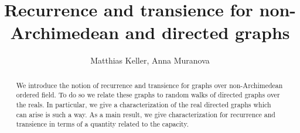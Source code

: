 \documentclass[a4paper,oneside, 12pt]{amsart}
\author[M. Keller, A. Muranova]{Matthias Keller, Anna Muranova}
\title[]{Recurrence and transience for non-Archimedean and directed graphs}
\numberwithin{theorem}{section}
\theoremstyle{definition}
\begin{document}
                         
\maketitle



\begin{abstract}
We introduce the notion of recurrence and transience for graphs over non-Archimedean ordered field. To do so we relate these graphs to random walks of directed graphs over the reals. In particular, we give a characterization of the real directed graphs which can arise is such a way. As a main result, we give characterization for recurrence and transience in terms of a quantity related to the capacity. 
\end{abstract}

\end{document}

